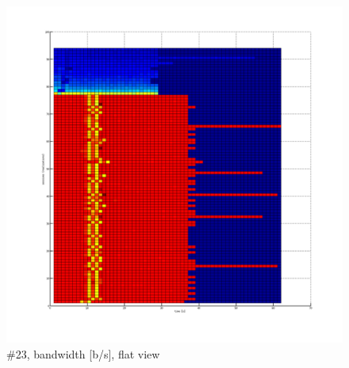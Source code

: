 \begin{figure}[htb]
	\begin{center}
	\includegraphics[width=\textwidth]{results-239-2d.png}
	\end{center}
	\caption[]{\#23, bandwidth [b/s], flat view}
	\label{img:results-239-2d.png}
\end{figure}
\FloatBarrier
\clearpage

